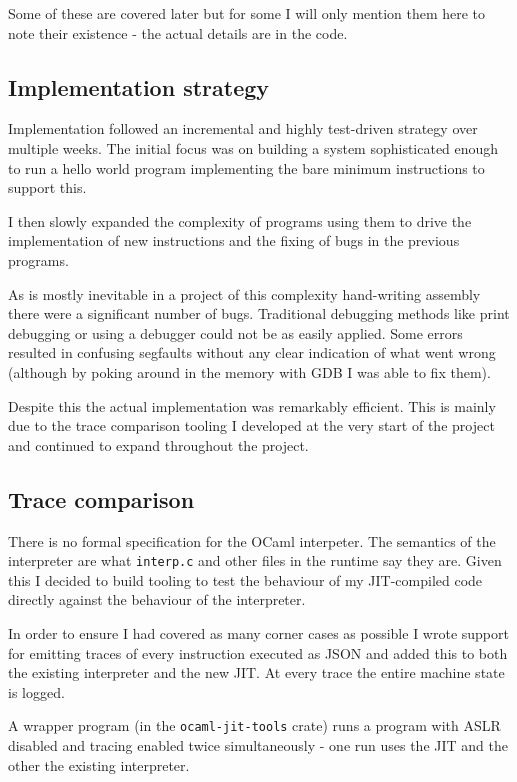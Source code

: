Some of these are covered later but for some I will only mention them here to note their existence
- the actual details are in the code.

\subsection{Implementation strategy}

Implementation followed an incremental and highly test-driven strategy over multiple weeks. The
initial focus was on building a system sophisticated enough to run a hello world program
implementing the bare minimum instructions to support this.

I then slowly expanded the complexity of programs using them to drive the implementation of new
instructions and the fixing of bugs in the previous programs.

As is mostly inevitable in a project of this complexity hand-writing assembly there were a
significant number of bugs. Traditional debugging methods like print debugging or using a debugger
could not be as easily applied. Some errors resulted in confusing segfaults without any clear
indication
of what went wrong (although by poking around in the memory with GDB I was able to fix them).

Despite this the actual implementation was remarkably efficient. This is mainly due to the trace
comparison tooling I developed at the very start of the project and continued to expand throughout
the project.

\subsection{Trace comparison} \label{tracing}

There is no formal specification for the OCaml interpeter. The semantics of the interpreter are
what
\texttt{interp.c} and other files in the runtime say they are. Given this I decided to build
tooling to test the behaviour of my JIT-compiled code directly against the behaviour of the
interpreter.

In order to ensure I had covered as many corner cases as possible I wrote support for emitting
traces of every instruction executed as JSON and added this to both the existing interpreter
and the new JIT. At every trace the entire machine state is logged.

A wrapper program (in the \texttt{ocaml-jit-tools} crate) runs a program with ASLR disabled and
tracing enabled twice
simultaneously - one run uses the JIT and the other the existing interpreter.

